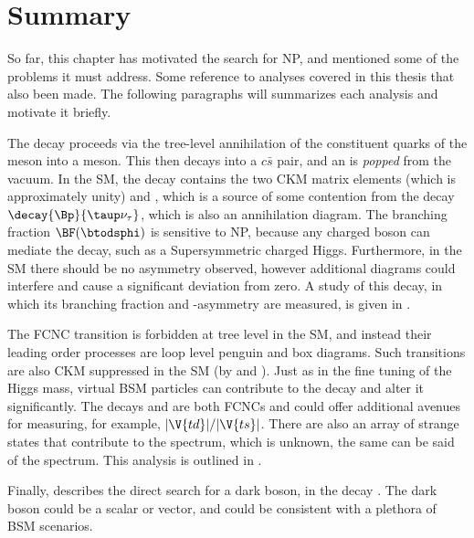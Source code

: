 \section{Summary}

So far, this chapter has motivated the search for NP, and mentioned some of the problems it must
address.
Some reference to analyses covered in this thesis that also been made.
The following paragraphs will summarizes each analysis and motivate it briefly.

The decay \btodsphi proceeds via the tree-level annihilation of the constituent quarks of the \Bp
meson into a \Wp meson.
This then decays into a $c\bar s$ pair, and an \ssbar is \emph{popped} from the vacuum.
In the SM, the decay contains the two CKM matrix elements  (which is approximately unity) and
, which is a source of some contention from the decay $\decay{\Bp}{\taup\nu_\tau}$, which
is also an annihilation diagram.
The branching fraction $\BF(\btodsphi)$ is sensitive to NP, because any charged boson can mediate
the decay, such as a Supersymmetric charged Higgs.
Furthermore, in the SM there should be no \CP asymmetry observed, however additional diagrams could
interfere and cause a significant deviation from zero.
A study of this decay, in which its branching fraction and \CP-asymmetry are measured, is given in
.


The FCNC transition  is forbidden at tree level in the SM, and instead their
leading order processes are loop level penguin and box diagrams.
Such transitions are also CKM suppressed in the SM (by  and ).
Just as in the fine tuning of the Higgs mass, virtual BSM particles can contribute to the decay and
alter it significantly.
The decays \btokpipimumu and \btophikmumu are both  FCNCs and could offer
additional avenues for measuring, for example, $|\V{td}|/|\V{ts}|$.
There are also an array of strange states that contribute to the \kpipi spectrum, which is unknown,
the same can be said of the \phik spectrum.
This analysis is outlined in .

Finally,  describes the direct search for a dark boson, \decay{\db}{\mumu} in the
decay \decay{\Bd}{\Kstarent\mumu}.
The dark boson could be a scalar or vector, and could be consistent with a plethora of BSM
scenarios.








